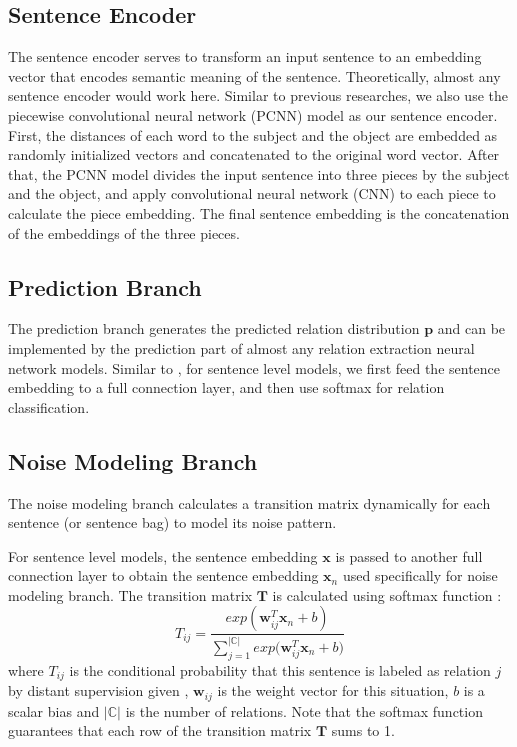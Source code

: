 \subsection{Sentence Encoder}
The sentence encoder serves to transform an input sentence to an embedding vector that encodes semantic meaning of the sentence. Theoretically, almost any sentence encoder would work here. Similar to previous researches, we also use the piecewise convolutional neural network (PCNN) model \cite{zeng2015distant} as our sentence encoder. First, the distances of each word to the subject and the object are embedded as randomly initialized vectors and concatenated to the original word vector. After that, the PCNN model divides the input sentence into three pieces by the subject and the object, and apply convolutional neural network (CNN) to each piece to calculate the piece embedding. The final sentence embedding is the concatenation of the embeddings of the three pieces.

\subsection{Prediction Branch}
The prediction branch generates the predicted relation distribution $\mathbf{p}$ and can be implemented by the prediction part of almost any relation extraction neural network models. Similar to \cite{luo2016temporal}, for sentence level models, we first feed the sentence embedding to a full connection layer, and then use softmax for relation classification.

\subsection{Noise Modeling Branch}
The noise modeling branch calculates a transition matrix dynamically for each sentence (or sentence bag) to model its noise pattern.

For sentence level models, the sentence embedding $\mathbf{x}$ is passed to another full connection layer to obtain the sentence embedding $\mathbf{x}_n$ used specifically for noise modeling branch. The transition matrix $\mathbf{T}$ is calculated using softmax function :
\begin{equation}
T_{ij} = \frac{exp({\mathbf{w}_{ij}^T \mathbf{x}_n + b})}{\sum_{j=1}^{|\mathbb{C}|}{exp({\mathbf{w}_{ij}^T \mathbf{x}_n + b}})}
\end{equation}
where $T_{ij}$ is the conditional probability that this sentence is labeled as relation $j$ by distant supervision given , $\mathbf{w}_{ij}$ is the weight vector for this situation, $b$ is a scalar bias and $|\mathbb{C}|$ is the number of relations. Note that the softmax function guarantees that each row of the transition matrix $\mathbf{T}$ sums to 1.

